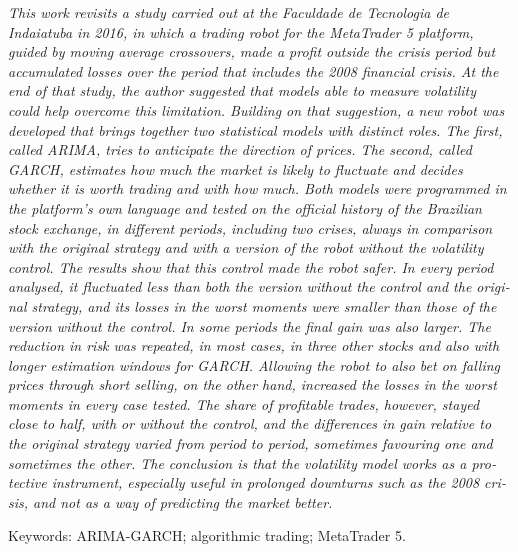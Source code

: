 \begin{resumo}[ABSTRACT]
\begin{otherlanguage}{english}
\itshape
This work revisits a study carried out at the Faculdade de Tecnologia de
Indaiatuba in 2016, in which a trading robot for the MetaTrader 5 platform,
guided by moving average crossovers, made a profit outside the crisis period but
accumulated losses over the period that includes the 2008 financial crisis. At the
end of that study, the author suggested that models able to measure volatility
could help overcome this limitation. Building on that suggestion, a new robot was
developed that brings together two statistical models with distinct roles. The
first, called ARIMA, tries to anticipate the direction of prices. The second,
called GARCH, estimates how much the market is likely to fluctuate and decides
whether it is worth trading and with how much. Both models were programmed in the platform's own
language and tested on the official history
of the Brazilian stock exchange, in different periods, including two crises, always in
comparison with the original strategy and with a version of the robot without the
volatility control. The results show that this control made the robot safer.
In every period analysed, it fluctuated less than both the version without the
control and the original strategy, and its losses in the worst moments were
smaller than those of the version without the control. In some periods the final
gain was also larger. The reduction in risk was repeated, in most cases, in three
other stocks and also with longer estimation windows for GARCH. Allowing the robot to also bet on
falling prices through short selling, on the other hand, increased the losses in
the worst moments in every case tested. The share of profitable trades, however, stayed close to half,
with or without the control, and the differences in gain relative to the original strategy
varied from period to period, sometimes favouring one and sometimes the other.
The conclusion is that
the volatility model works as a protective instrument, especially useful in
prolonged downturns such as the 2008 crisis, and not as a way of predicting the
market better.

\vspace{\onelineskip}
\noindent Keywords: ARIMA-GARCH; algorithmic trading; MetaTrader 5.
\end{otherlanguage}
\end{resumo}
